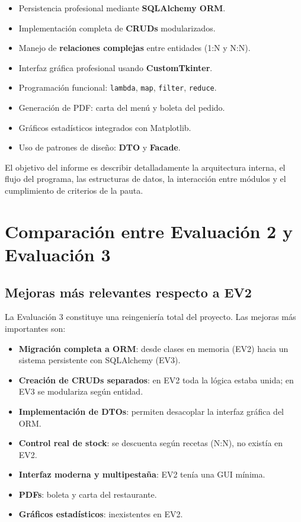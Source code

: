 \documentclass[11pt,letterpaper]{article}
\begin{document}
\begin{itemize}
    \item Persistencia profesional mediante \textbf{SQLAlchemy ORM}.
    \item Implementación completa de \textbf{CRUDs} modularizados.
    \item Manejo de \textbf{relaciones complejas} entre entidades (1:N y N:N).
    \item Interfaz gráfica profesional usando \textbf{CustomTkinter}.
    \item Programación funcional: \texttt{lambda}, \texttt{map}, \texttt{filter}, \texttt{reduce}.
    \item Generación de PDF: carta del menú y boleta del pedido.
    \item Gráficos estadísticos integrados con Matplotlib.
    \item Uso de patrones de diseño: \textbf{DTO} y \textbf{Facade}.
\end{itemize}

El objetivo del informe es describir detalladamente la arquitectura interna, el flujo del programa, las estructuras de datos, la interacción entre módulos y el cumplimiento de criterios de la pauta.


\section{Comparación entre Evaluación 2 y Evaluación 3}


\subsection{Mejoras más relevantes respecto a EV2}

La Evaluación 3 constituye una reingeniería total del proyecto. Las mejoras más importantes son:

\begin{itemize}
    \item \textbf{Migración completa a ORM}: desde clases en memoria (EV2) hacia un sistema persistente con SQLAlchemy (EV3).
    \item \textbf{Creación de CRUDs separados}: en EV2 toda la lógica estaba unida; en EV3 se modulariza según entidad.
    \item \textbf{Implementación de DTOs}: permiten desacoplar la interfaz gráfica del ORM.
    \item \textbf{Control real de stock}: se descuenta según recetas (N:N), no existía en EV2.
    \item \textbf{Interfaz moderna y multipestaña}: EV2 tenía una GUI mínima.
    \item \textbf{PDFs}: boleta y carta del restaurante.
    \item \textbf{Gráficos estadísticos}: inexistentes en EV2.
\end{itemize}
\end{document}
